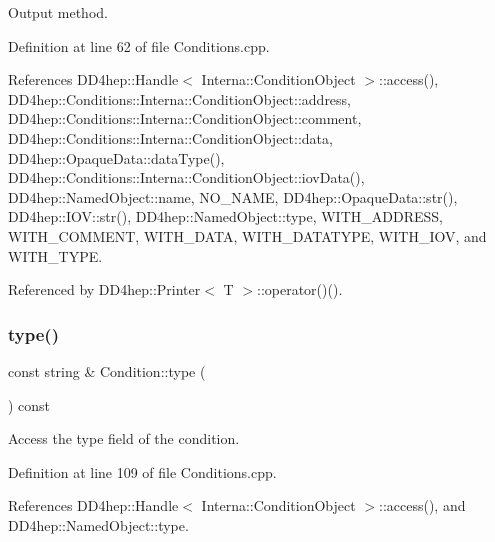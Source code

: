 Output method. 



Definition at line 62 of file Conditions.\+cpp.



References D\+D4hep\+::\+Handle$<$ Interna\+::\+Condition\+Object $>$\+::access(), D\+D4hep\+::\+Conditions\+::\+Interna\+::\+Condition\+Object\+::address, D\+D4hep\+::\+Conditions\+::\+Interna\+::\+Condition\+Object\+::comment, D\+D4hep\+::\+Conditions\+::\+Interna\+::\+Condition\+Object\+::data, D\+D4hep\+::\+Opaque\+Data\+::data\+Type(), D\+D4hep\+::\+Conditions\+::\+Interna\+::\+Condition\+Object\+::iov\+Data(), D\+D4hep\+::\+Named\+Object\+::name, N\+O\+\_\+\+N\+A\+ME, D\+D4hep\+::\+Opaque\+Data\+::str(), D\+D4hep\+::\+I\+O\+V\+::str(), D\+D4hep\+::\+Named\+Object\+::type, W\+I\+T\+H\+\_\+\+A\+D\+D\+R\+E\+SS, W\+I\+T\+H\+\_\+\+C\+O\+M\+M\+E\+NT, W\+I\+T\+H\+\_\+\+D\+A\+TA, W\+I\+T\+H\+\_\+\+D\+A\+T\+A\+T\+Y\+PE, W\+I\+T\+H\+\_\+\+I\+OV, and W\+I\+T\+H\+\_\+\+T\+Y\+PE.



Referenced by D\+D4hep\+::\+Printer$<$ T $>$\+::operator()().

\hypertarget{class_d_d4hep_1_1_conditions_1_1_condition_ab7536a2d10c19c6d94f34e11b13f76c5}{}\label{class_d_d4hep_1_1_conditions_1_1_condition_ab7536a2d10c19c6d94f34e11b13f76c5} 
\subsubsection{\texorpdfstring{type()}{type()}}
{\footnotesize\ttfamily const string \& Condition\+::type (\begin{DoxyParamCaption}{ }\end{DoxyParamCaption}) const}



Access the type field of the condition. 



Definition at line 109 of file Conditions.\+cpp.



References D\+D4hep\+::\+Handle$<$ Interna\+::\+Condition\+Object $>$\+::access(), and D\+D4hep\+::\+Named\+Object\+::type.

\hypertarget{class_d_d4hep_1_1_conditions_1_1_condition_a020822867189328e00a3bf3c490d9e87}{}\label{class_d_d4hep_1_1_conditions_1_1_condition_a020822867189328e00a3bf3c490d9e87} 
